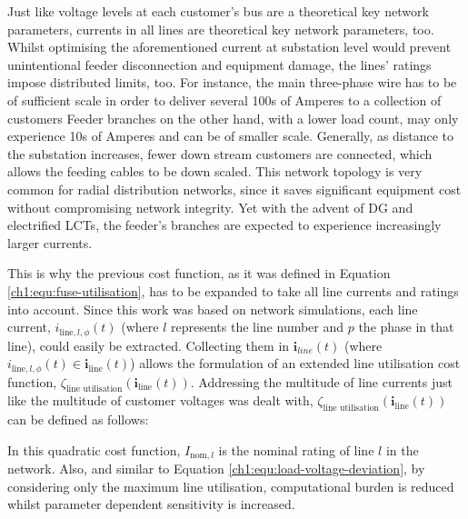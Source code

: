 Just like voltage levels at each customer's bus are a theoretical key network parameters, currents in all lines are theoretical key network parameters, too.
Whilst optimising the aforementioned current at substation level would prevent unintentional feeder disconnection and equipment damage, the lines' ratings impose distributed limits, too.
For instance, the main three-phase wire has to be of sufficient scale in order to deliver several 100s of Amperes to a collection of customers
Feeder branches on the other hand, with a lower load count, may only experience 10s of Amperes and can be of smaller scale.
Generally, as distance to the substation increases, fewer down stream customers are connected, which allows the feeding cables to be down scaled.
This network topology is very common for radial distribution networks, since it saves significant equipment cost without compromising network integrity.
Yet with the advent of DG and electrified LCTs, the feeder's branches are expected to experience increasingly larger currents.


This is why the previous cost function, as it was defined in Equation \ref{ch1:equ:fuse-utilisation}, has to be expanded to take all line currents and ratings into account.
Since this work was based on network simulations, each line current, $i_{\text{line},l,\phi}(t)$ (where $l$ represents the line number and $p$ the phase in that line), could easily be extracted.
Collecting them in $\textbf{i}_{line}(t)$ (where $i_{\text{line},l,\phi}(t) \in \textbf{i}_\text{line}(t)$) allows the formulation of an extended line utilisation cost function, $\zeta_\text{line utilisation}(\textbf{i}_\text{line}(t))$.
Addressing the multitude of line currents just like the multitude of customer voltages was dealt with, $\zeta_\text{line utilisation}(\textbf{i}_\text{line}(t))$ can be defined as follows:



In this quadratic cost function, $I_{\text{nom},l}$ is the nominal rating of line $l$ in the network.
Also, and similar to Equation \ref{ch1:equ:load-voltage-deviation}, by considering only the maximum line utilisation, computational burden is reduced whilst parameter dependent sensitivity is increased.

